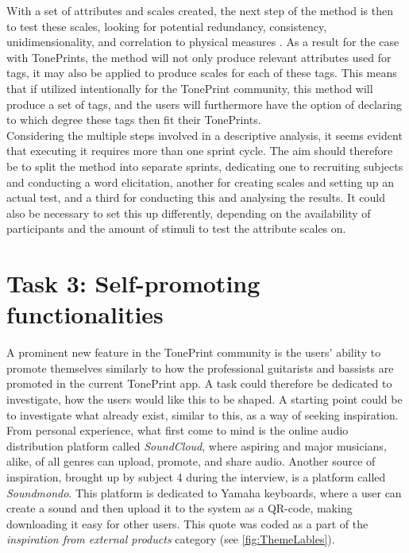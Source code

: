 With a set of attributes and scales created, the next step of the method is then to test these scales, looking for potential redundancy, consistency, unidimensionality, and correlation to physical measures \parencite[][10]{PDF:DescriptiveAnalysis}. As a result for the case with TonePrints, the method will not only produce relevant attributes used for tags, it may also be applied to produce scales for each of these tags. This means that if utilized intentionally for the TonePrint community, this method will produce a set of tags, and the users will furthermore have the option of declaring to which degree these tags then fit their TonePrints.\\

\noindent
Considering the multiple steps involved in a descriptive analysis, it seems evident that executing it requires more than one sprint cycle. The aim should therefore be to split the method into separate sprints, dedicating one to recruiting subjects and conducting a word elicitation, another for creating scales and setting up an actual test, and a third for conducting this and analysing the results. It could also be necessary to set this up differently, depending on the availability of participants and the amount of stimuli to test the attribute scales on.



\section{Task 3: Self-promoting functionalities}
\label{Task3}
A prominent new feature in the TonePrint community is the users' ability to promote themselves similarly to how the professional guitarists and bassists are promoted in the current TonePrint app. A task could therefore be dedicated to investigate, how the users would like this to be shaped. A starting point could be to investigate what already exist, similar to this, as a way of seeking inspiration. From personal experience, what first come to mind is the online audio distribution platform called \textit{SoundCloud}, where aspiring and major musicians, alike, of all genres can upload, promote, and share audio. Another source of inspiration, brought up by subject 4 during the interview, is a platform called \textit{Soundmondo}. This platform is dedicated to Yamaha keyboards, where a user can create a sound and then upload it to the system as a QR-code, making downloading it easy for other users. This quote was coded as a part of the \textit{inspiration from external products} category (see \autoref{fig:ThemeLables}).

